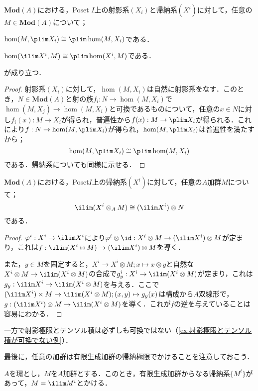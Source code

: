 \begin{prop}
	$\mathbf{Mod}(A)$における，Poset $I$上の射影系$(X_i)$と帰納系$(X^i)$に対して，任意の$M\in\mathbf{Mod}(A)$について；
	\begin{sakura}
		\item $\hom(M,\plim X_i)\cong\plim\hom(M,X_i)$である．
		\item $\hom(\ilim X^i,M)\cong\plim\hom(X^i,M)$である．
	\end{sakura}
	が成り立つ．
\end{prop}

\begin{proof}
	射影系$(X_i)$に対して，$\hom(M,X_i)$は自然に射影系をなす．このとき，$N\in\mathbf{Mod}(A)$と射の族$f_i:N\to\hom(M,X_i)$で$\hom(M,X_j)\to\hom(M,X_i)$と可換であるものについて，任意の$x\in N$に対し$f_i(x):M\to X_i$が得られ，普遍性から$f(x):M\to\plim X_i$が得られる．これにより$f:N\to\hom(M,\plim X_i)$が得られ，$\hom(M,\plim X_i)$は普遍性を満たすから；
	\[\hom(M,\plim X_i)\cong\plim\hom(M,X_i)\]
	である．帰納系についても同様に示せる．
\end{proof}

\begin{prop}\label{prop:帰納極限とテンソル積の交換}
	$\mathbf{Mod}(A)$における，Poset$I$上の帰納系$(X^i)$に対して，任意の$A$加群$M$について；
	\[\ilim(X^i\otimes_A M)\cong(\ilim X^i)\otimes N\]
	である．
\end{prop}

\begin{proof}
	$\varphi^i:X^i\to\ilim X^i$により$\varphi^i\otimes\id:X^i\otimes M\to(\ilim X^i)\otimes M$が定まり，これは$f:\ilim(X^i\otimes M)\to(\ilim X^i)\otimes M$を導く．
	
	また，$y\in M$を固定すると，$X^i\to X^i\otimes M;x\mapsto x\otimes y$と自然な$X^i\otimes M\to\ilim(X^i\otimes M)$の合成で$g^i_y:X^i\to\ilim(X^i\otimes M)$が定まり，これは$g_y:\ilim X^i\to\ilim(X^i\otimes M)$を与える．ここで$(\ilim X^i)\times M\to\ilim(X^i\otimes M);(x,y)\mapsto g_y(x)$は構成から$A$双線形で，$g:(\ilim X^i)\otimes M\to\ilim(X^i\otimes M)$を導く．これが$f$の逆を与えていることは容易にわかる．
\end{proof}

一方で射影極限とテンソル積は必ずしも可換ではない（\ref{ex:射影極限とテンソル積が可換でない例}）．

最後に，任意の加群は有限生成加群の帰納極限でかけることを注意しておこう．

\begin{prop}\label{prop:任意の加群は有限生成の帰納極限}
	$A$を環とし，$M$を$A$加群とする．このとき，有限生成加群からなる帰納系$\{M^i\}$があって，$M=\ilim M^i$とかける．
\end{prop}

